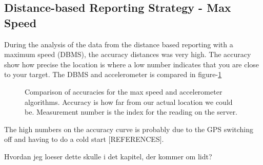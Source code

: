 \subsection{Distance-based Reporting Strategy - Max Speed}
During the analysis of the data from the distance based reporting with a maximum speed (DBMS), the accuracy distances was very high. The accuracy show how precise the location is where a low number indicates that you are close to your target. The DBMS and accelerometer is compared in figure-\ref{maxspeedaccelerometeraccuracy}

\begin{figure}[h]

\caption{Comparison of accuracies for the max speed and accelerometer algorithms. Accuracy is how far from our actual location we could be. Measurement number is the index for the reading on the server.}
\label{maxspeedaccelerometeraccuracy}
\end{figure}

The high numbers on the accuracy curve is probably due to the GPS switching off and having to do a cold start [REFERENCES].

Hvordan jeg loeser dette skulle i det kapitel, der kommer om lidt?